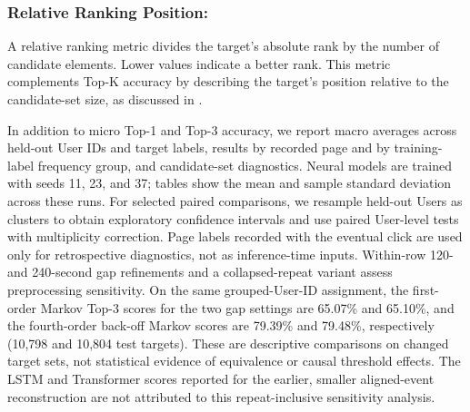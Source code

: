 \documentclass[sn-mathphys-num, Numbered]{sn-jnl}%
\theoremstyle{thmstyleone}%
\theoremstyle{thmstyletwo}%
\theoremstyle{thmstylethree}%
\providecommand{\DIFadd}[1]{{\protect\color{green!40!black}#1}} %
\providecommand{\DIFdel}[1]{}                      %
\providecommand{\DIFaddbegin}{} %
\providecommand{\DIFaddend}{} %
\providecommand{\DIFdelbegin}{} %
\providecommand{\DIFdelend}{} %
\newcommand{\DIFscaledelfig}{0.5}
\newlength{\DIFdelgraphicswidth} %
\newlength{\DIFdelgraphicsheight} %
\newcommand{\DIFaddincludegraphics}[2][]{{\color{blue}\fbox{\DIFOincludegraphics[#1]{#2}}}} %
\newcommand{\DIFdelincludegraphics}[2][]{%
\sbox{\DIFdelgraphicsbox}{\DIFOincludegraphics[#1]{#2}}%
\settoboxwidth{\DIFdelgraphicswidth}{\DIFdelgraphicsbox} %
\settoboxtotalheight{\DIFdelgraphicsheight}{\DIFdelgraphicsbox} %
\scalebox{\DIFscaledelfig}{%
\parbox[b]{\DIFdelgraphicswidth}{\usebox{\DIFdelgraphicsbox}\\[-\baselineskip] \rule{\DIFdelgraphicswidth}{0em}}\llap{\resizebox{\DIFdelgraphicswidth}{\DIFdelgraphicsheight}{%
\setlength{\unitlength}{\DIFdelgraphicswidth}%
\begin{picture}(1,1)%
\thicklines\linethickness{2pt} %
{\color[rgb]{1,0,0}\put(0,0){\framebox(1,1){}}}%
{\color[rgb]{1,0,0}\put(0,0){\line( 1,1){1}}}%
{\color[rgb]{1,0,0}\put(0,1){\line(1,-1){1}}}%
\end{picture}%
}\hspace*{3pt}}} %
} %
\DeclareRobustCommand{\DIFaddbegin}{\DIFOaddbegin \let\includegraphics\DIFaddincludegraphics} %
\DeclareRobustCommand{\DIFaddend}{\DIFOaddend \let\includegraphics\DIFOincludegraphics} %
\DeclareRobustCommand{\DIFdelbegin}{\DIFOdelbegin \let\includegraphics\DIFdelincludegraphics} %
\DeclareRobustCommand{\DIFdelend}{\DIFOaddend \let\includegraphics\DIFOincludegraphics} %
\begin{document}
\subsubsection{Relative Ranking Position:}

A relative ranking metric \DIFdelbegin \DIFdel{, calculated as the absolute }\DIFdelend \DIFaddbegin \DIFadd{divides the target's absolute rank by the number of candidate elements. Lower values indicate a better }\DIFaddend rank\DIFdelbegin \DIFdel{divided by the total elements(value in $[0, 1)$, indicates better performance when lower}\DIFdelend . This metric complements \DIFdelbegin \DIFdel{$Top-K Accuracy$ by focusing on the positional importance of the targetelement }\DIFdelend \DIFaddbegin \DIFadd{Top-K accuracy by describing the target's position }\DIFaddend relative to the \DIFdelbegin \DIFdel{page }\DIFdelend \DIFaddbegin \DIFadd{candidate-set }\DIFaddend size, as \DIFdelbegin \DIFdel{described }\DIFdelend \DIFaddbegin \DIFadd{discussed }\DIFaddend in \cite{zhou2021large}.

\DIFdelbegin \DIFdel{Data Preparation.}
\DIFdel{To predict the next user click using the data, it is divided into two sets: training and testing. This division is made with 80\%allocated for training and 20\% for testing.
The purpose of this division is to use the training data to train the model and }\DIFdelend \DIFaddbegin \DIFadd{In addition to micro Top-1 and Top-3 accuracy, we report macro averages across held-out User IDs and target labels, results by recorded page and by training-label frequency group, and candidate-set diagnostics. Neural models are trained with seeds 11, 23, and 37; tables show the mean and sample standard deviation across these runs. For selected paired comparisons, we resample held-out Users as clusters to obtain exploratory confidence intervals and use paired User-level tests with multiplicity correction. Page labels recorded with the eventual click are used only for retrospective diagnostics, not as inference-time inputs. Within-row 120- and 240-second gap refinements and a collapsed-repeat variant assess preprocessing sensitivity. On the same grouped-User-ID assignment, }\DIFaddend the \DIFdelbegin \DIFdel{testing data to evaluate the model. Given that 4216 click sequences are provided as }\DIFdelend \DIFaddbegin \DIFadd{first-order Markov Top-3 scores for the two gap settings are 65.07\% and 65.10\%, and }\DIFaddend the \DIFdelbegin \DIFdel{dataset for the model, }\DIFdelend \DIFaddbegin \DIFadd{fourth-order back-off Markov scores are 79.39\% }\DIFaddend and \DIFdelbegin \DIFdel{20\%of the data is set aside for testing, the number of test data points is determined to be 843. These test sequences are then used for prediction. }\DIFdelend \DIFaddbegin \DIFadd{79.48\%, respectively (10,798 and 10,804 test targets). These are descriptive comparisons on changed target sets, not statistical evidence of equivalence or causal threshold effects. The LSTM and Transformer scores reported for the earlier, smaller aligned-event reconstruction are not attributed to this repeat-inclusive sensitivity analysis.
}\DIFaddend 
\end{document}
